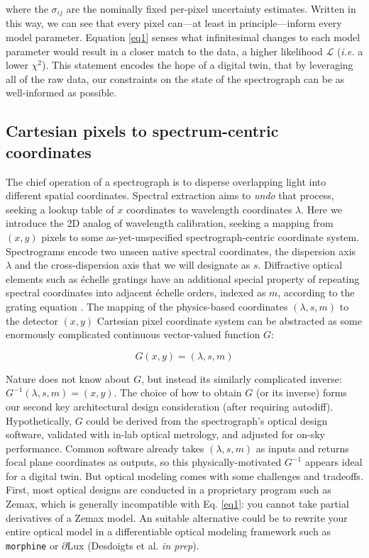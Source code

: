 \documentclass[twocolumn]{aastex631}
\begin{document}
where the $\sigma_{ij}$ are the nominally fixed per-pixel uncertainty estimates.  Written in this way, we can see that every pixel can---at least in principle---inform every model parameter.  Equation \ref{eq1} senses what infinitesimal changes to each model parameter would result in a closer match to the data, a higher likelihood $\mathcal{L}$ (\emph{i.e.} a lower $\chi^2$).  This statement encodes the hope of a digital twin, that by leveraging all of the raw data, our constraints on the state of the spectrograph can be as well-informed as possible.

\subsection{Cartesian pixels to spectrum-centric coordinates}

The chief operation of a spectrograph is to disperse overlapping light into different spatial coordinates.  Spectral extraction aims to \emph{undo} that process, seeking a lookup table of $x$ coordinates to wavelength coordinates $\lambda$.  Here we introduce the 2D analog of wavelength calibration, seeking a mapping from $(x, y)$ pixels to some as-yet-unspecified spectrograph-centric coordinate system.  Spectrograms encode two unseen native spectral coordinates, the dispersion axis $\lambda$ and the cross-dispersion axis that we will designate as $s$.  Diffractive optical elements such as \'echelle gratings have an additional special property of repeating spectral coordinates into adjacent \'echelle orders, indexed as $m$, according to the grating equation \citep{2012sdf..book.....J}.  The mapping of the physics-based coordinates $(\lambda, s, m)$ to the detector $(x, y)$ Cartesian pixel coordinate system can be abstracted as some enormously complicated continuous vector-valued function $G$:

\begin{equation}
  G(x,y) = (\lambda, s, m)
\end{equation}

Nature does not know about $G$, but instead its similarly complicated inverse: $G^{-1}(\lambda, s, m) = (x,y)$.  The choice of how to obtain $G$ (or its inverse) forms our second key architectural design consideration (after requiring autodiff).  Hypothetically, $G$ could be derived from the spectrograph's optical design software, validated with in-lab optical metrology, and adjusted for on-sky performance. Common software already takes $(\lambda, s, m)$ as inputs and returns focal plane coordinates as outputs, so this physically-motivated $G^{-1}$ appears ideal for a digital twin. But optical modeling comes with some challenges and tradeoffs.  First, most optical designs are conducted in a proprietary program such as Zemax\texttrademark, which is generally incompatible with Eq. \ref{eq1}: you cannot take partial derivatives of a Zemax model.  An suitable alternative could be to rewrite your entire optical model in a differentiable optical modeling framework such as \texttt{morphine} \citep{2021ApJ...907...40P} or $\partial{\mathrm{Lux}}$ (Desdoigts et al. \emph{in prep}).
\end{document}
